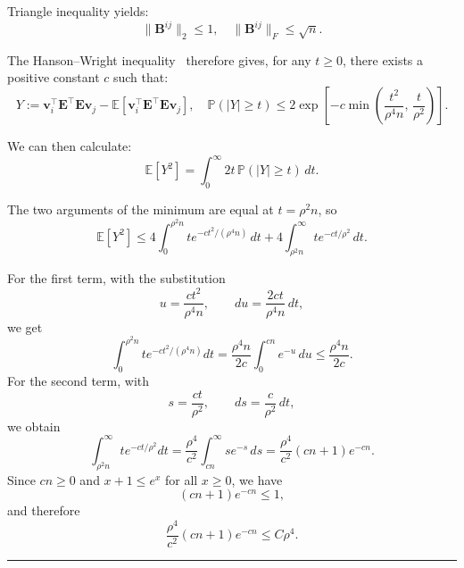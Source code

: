 \documentclass{article}
\newcommand{\twonorm}[1]{\|#1\|_2}
\newcommand{\Ex}[1]{\mbox{}\mathbb{E}\left[#1\right]}
\newcommand{\pr}[1]{\mbox{}\mathbb{P}\left(#1\right)}
\newcommand{\ts}{\top}
\newcommand{\vb}{\mathbf{v}}
\newcommand{\Bb}{\mathbf{B}}
\newcommand{\Eb}{\mathbf{E}}
\newcommand{\BlackBox}{\rule{1.5ex}{1.5ex}}  %
\newenvironment{proof}{\par\noindent{\bf Proof\ }}{\hfill\BlackBox\par\medskip}
\newcommand{\rbr}[1]{\left(#1\right)}
\newcommand{\sbr}[1]{\left[#1\right]}
\newcommand{\abr}[1]{\left|#1\right|}
\newcommand{\norm}[1]{\|#1\|}
\begin{document}
\begin{proof}
Triangle inequality yields:
\begin{equation}
    \twonorm{\Bb^{ij}} \le 1, \quad\norm{\Bb^{ij}}_F \le \sqrt{n}.
\end{equation}

The Hanson--Wright inequality~\citep[Theorem~6.2.2]{Vershynin_2026} therefore gives, for any $t\ge 0$, there exists a positive constant $c$ such that:
\begin{equation*}
Y := \vb_i^\ts \Eb^\ts \Eb \vb_j - \Ex{\vb_i^\ts \Eb^\ts \Eb \vb_j}, \quad    \pr{\abr{Y}\ge t} \le 2\exp\sbr{-c\min\rbr{\frac{t^2}{\rho^4 n},\,\frac{t}{\rho^2}}}.
\end{equation*}

We can then calculate:
\begin{equation}
    \mathbb{E}[Y^2] = \int_0^\infty 2t\,\mathbb{P}(|Y|\ge t)\,dt.
\end{equation}

The two arguments of the minimum are equal at $t=\rho^2 n$, so
\begin{equation*}
    \Ex{Y^2} \le 4\int_0^{\rho^2 n} t e^{-ct^2/(\rho^4 n)}\,dt + 4\int_{\rho^2 n}^{\infty} t e^{-ct/\rho^2}\,dt.
\end{equation*}

For the first term, with the substitution
\begin{equation}
    u=\frac{ct^2}{\rho^4 n},
    \qquad
    du=\frac{2ct}{\rho^4 n}\,dt,
\end{equation}
we get
\begin{equation}
    \int_0^{\rho^2 n} t e^{-ct^2/(\rho^4 n)}dt
    =
    \frac{\rho^4 n}{2c}\int_0^{cn} e^{-u}\,du
    \le
    \frac{\rho^4 n}{2c}.
\end{equation}
For the second term, with
\begin{equation}
    s=\frac{ct}{\rho^2},
    \qquad
    ds = \frac{c}{\rho^2}\,dt,
\end{equation}
we obtain
\begin{equation}
    \int_{\rho^2 n}^{\infty} t e^{-ct/\rho^2}dt
    =
    \frac{\rho^4}{c^2}\int_{cn}^{\infty} s e^{-s}\,ds
    =
    \frac{\rho^4}{c^2}(cn+1)e^{-cn}.
\end{equation}
Since $cn\ge 0$ and $x+1\le e^x$ for all $x\ge 0$, we have
\begin{equation}
    (cn+1)e^{-cn}\le 1,
\end{equation}
and therefore
\begin{equation}
    \frac{\rho^4}{c^2}(cn+1)e^{-cn}
    \le
    C\rho^4.
\end{equation}


\end{proof}
\end{document}
